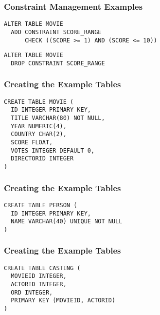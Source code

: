 \documentclass[dvipsnames]{beamer}
\theoremstyle{plain}
\begin{document}
\begin{frame}[fragile]
  \frametitle{Constraint Management Examples}

  \begin{example}
    \begin{lstlisting}
ALTER TABLE MOVIE
  ADD CONSTRAINT SCORE_RANGE
      CHECK ((SCORE >= 1) AND (SCORE <= 10))
    \end{lstlisting}
  \end{example}

  \pause
  \begin{example}
    \begin{lstlisting}
ALTER TABLE MOVIE
  DROP CONSTRAINT SCORE_RANGE
    \end{lstlisting}
  \end{example}
\end{frame}

\begin{frame}[fragile]
  \frametitle{Creating the Example Tables}

  \begin{example}
    \begin{lstlisting}
CREATE TABLE MOVIE (
  ID INTEGER PRIMARY KEY,
  TITLE VARCHAR(80) NOT NULL,
  YEAR NUMERIC(4),
  COUNTRY CHAR(2),
  SCORE FLOAT,
  VOTES INTEGER DEFAULT 0,
  DIRECTORID INTEGER
)
    \end{lstlisting}
  \end{example}
\end{frame}

\begin{frame}[fragile]
  \frametitle{Creating the Example Tables}

  \begin{example}
    \begin{lstlisting}
CREATE TABLE PERSON (
  ID INTEGER PRIMARY KEY,
  NAME VARCHAR(40) UNIQUE NOT NULL
)
    \end{lstlisting}
  \end{example}
\end{frame}

\begin{frame}[fragile]
  \frametitle{Creating the Example Tables}

  \begin{example}
    \begin{lstlisting}
CREATE TABLE CASTING (
  MOVIEID INTEGER,
  ACTORID INTEGER,
  ORD INTEGER,
  PRIMARY KEY (MOVIEID, ACTORID)
)
    \end{lstlisting}
  \end{example}
\end{frame}
\end{document}
